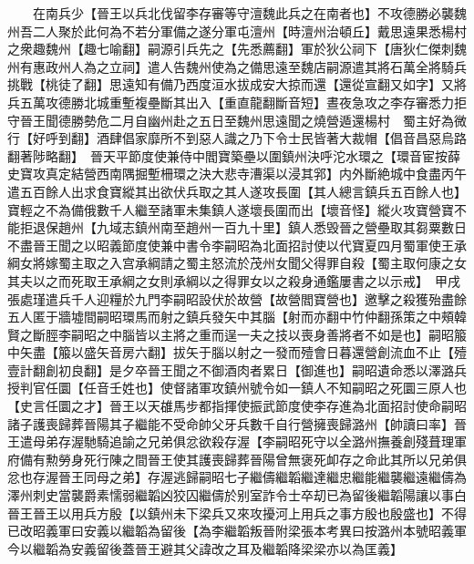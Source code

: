 　　在南兵少【晉王以兵北伐留李存審等守澶魏此兵之在南者也】不攻德勝必襲魏州吾二人聚於此何為不若分軍備之遂分軍屯澶州【時澶州治頓丘】戴思遠果悉楊村之衆趣魏州【趣七喻翻】嗣源引兵先之【先悉薦翻】軍於狄公祠下【唐狄仁傑刺魏州有惠政州人為之立祠】遣人告魏州使為之備思遠至魏店嗣源遣其將石萬全將騎兵挑戰【桃徒了翻】思遠知有備乃西度洹水拔成安大掠而還【還從宣翻又如字】又將兵五萬攻德勝北城重塹複壘斷其出入【重直龍翻斷音短】晝夜急攻之李存審悉力拒守晉王聞德勝勢危二月自幽州赴之五日至魏州思遠聞之燒營遁還楊村　蜀主好為微行【好呼到翻】酒肆倡家靡所不到惡人識之乃下令士民皆著大裁帽【倡音昌惡烏路翻著陟略翻】　晉天平節度使兼侍中閻寶築壘以圍鎮州決呼沱水環之【環音宦按薛史寶攻真定結營西南隅掘塹柵環之決大悲寺漕渠以浸其郛】内外斷絶城中食盡丙午遣五百餘人出求食寶縱其出欲伏兵取之其人遂攻長圍【其人總言鎮兵五百餘人也】寶輕之不為備俄數千人繼至諸軍未集鎮人遂壞長圍而出【壞音怪】縱火攻寶營寶不能拒退保趙州【九域志鎮州南至趙州一百九十里】鎮人悉毁晉之營壘取其芻粟數日不盡晉王聞之以昭義節度使兼中書令李嗣昭為北面招討使以代寶夏四月蜀軍使王承綱女將嫁蜀主取之入宫承綱請之蜀主怒流於茂州女聞父得罪自殺【蜀主取何康之女其夫以之而死取王承綱之女則承綱以之得罪女以之殺身通鑑屢書之以示戒】　甲戌張處瑾遣兵千人迎糧於九門李嗣昭設伏於故營【故營閻寶營也】邀擊之殺獲殆盡餘五人匿于牆墟間嗣昭環馬而射之鎮兵發矢中其腦【射而亦翻中竹仲翻孫策之中頰韓賢之斷脛李嗣昭之中腦皆以主將之重而逞一夫之技以喪身善將者不如是也】嗣昭箙中矢盡【箙以盛矢音房六翻】拔矢于腦以射之一發而殪會日暮還營創流血不止【殪壹計翻創初良翻】是夕卒晉王聞之不御酒肉者累日【御進也】嗣昭遺命悉以澤潞兵授判官任圜【任音壬姓也】使督諸軍攻鎮州號令如一鎮人不知嗣昭之死圜三原人也【史言任圜之才】晉王以天䧺馬步都指揮使振武節度使李存進為北面招討使命嗣昭諸子護喪歸葬晉陽其子繼能不受命帥父牙兵數千自行營擁喪歸潞州【帥讀曰率】晉王遣母弟存渥馳騎追諭之兄弟俱忿欲殺存渥【李嗣昭死守以全潞州撫養創殘葺理軍府備有勲勞身死行陳之間晉王使其護喪歸葬晉陽曾無褒死卹存之命此其所以兄弟俱忿也存渥晉王同母之弟】存渥逃歸嗣昭七子繼儔繼韜繼達繼忠繼能繼襲繼遠繼儔為澤州刺史當襲爵素懦弱繼韜凶狡囚繼儔於别室詐令士卒刧已為留後繼韜陽讓以事白晉王晉王以用兵方殷【以鎮州未下梁兵又來攻擾河上用兵之事方殷也殷盛也】不得已改昭義軍曰安義以繼韜為留後【為李繼韜叛晉附梁張本考異曰按潞州本號昭義軍今以繼韜為安義留後蓋晉王避其父諱改之耳及繼韜降梁梁亦以為匡義】

